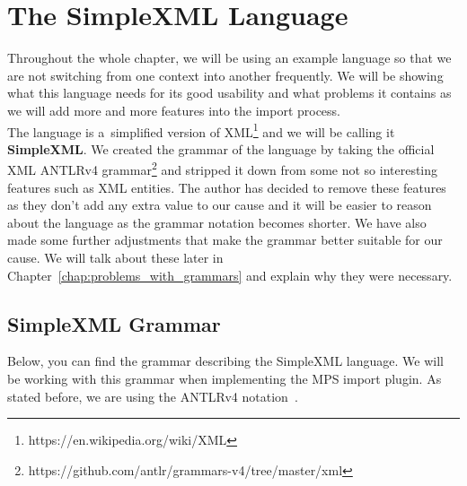 \section{The SimpleXML Language}

Throughout the whole chapter, we will be using an example language so that we are not switching from one context into another frequently.
We will be showing what this language needs for its good usability and what problems it contains as we will add more and more features into the import process.
\\

The language is a~simplified version of XML\footnote{https://en.wikipedia.org/wiki/XML} and we will be calling it \textbf{SimpleXML}.
We created the grammar of the language by taking the official XML ANTLRv4 grammar\footnote{https://github.com/antlr/grammars-v4/tree/master/xml} and stripped it down from some not so interesting features such as XML entities.
The author has decided to remove these features as they don't add any extra value to our cause and it will be easier to reason about the language as the grammar notation becomes shorter.
We have also made some further adjustments that make the grammar better suitable for our cause.
We will talk about these later in Chapter~\ref{chap:problems_with_grammars} and explain why they were necessary.

\newpage

\subsection{SimpleXML Grammar}
\label{chap:simplexml_grammar}

Below, you can find the grammar describing the SimpleXML language.
We will be working with this grammar when implementing the MPS import plugin.
As stated before, we are using the ANTLRv4 notation~\cite{ANTLR4reference}.

